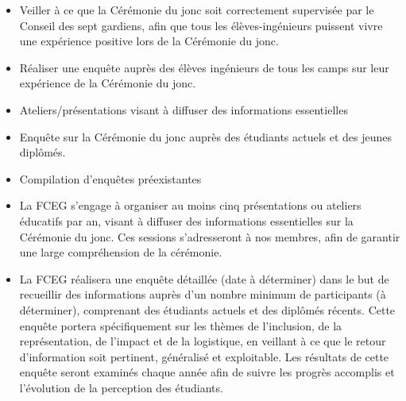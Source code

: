 \begin{itemize}
 \item Veiller à ce que la Cérémonie du jonc soit correctement supervisée par le Conseil des sept gardiens, afin que tous les élèves-ingénieurs puissent vivre une expérience positive lors de la Cérémonie du jonc.
 \item Réaliser une enquête auprès des élèves ingénieurs de tous les camps sur leur expérience de la Cérémonie du jonc.
 \item Ateliers/présentations visant à diffuser des informations essentielles
 \item Enquête sur la Cérémonie du jonc auprès des étudiants actuels et des jeunes diplômés.
 \item Compilation d'enquêtes préexistantes
 \item La FCEG s'engage à organiser au moins cinq présentations ou ateliers éducatifs par an, visant à diffuser des informations essentielles sur la Cérémonie du jonc. Ces sessions s'adresseront à nos membres, afin de garantir une large compréhension de la cérémonie.
 \item La FCEG réalisera une enquête détaillée (date à déterminer) dans le but de recueillir des informations auprès d'un nombre minimum de participants (à déterminer), comprenant des étudiants actuels et des diplômés récents. Cette enquête portera spécifiquement sur les thèmes de l'inclusion, de la représentation, de l'impact et de la logistique, en veillant à ce que le retour d'information soit pertinent, généralisé et exploitable. Les résultats de cette enquête seront examinés chaque année afin de suivre les progrès accomplis et l'évolution de la perception des étudiants.
\end{itemize}

\newpage
